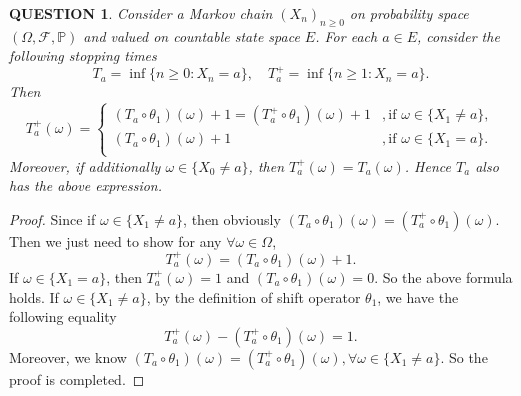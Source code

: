 \documentclass[12pt]{article}
\renewcommand{\(}{\left(}%
\renewcommand{\)}{\right)}%
\renewcommand{\[}{\left[}%
\renewcommand{\]}{\right]}%
\newcommand{\p}{\mathbb{P}}
\newcommand{\f}{\mathscr{F}}
\newtheorem{question}{QUESTION}[section]}
\newtheorem{proof}{Proof.}}
\begin{document}
  \begin{question}
  	Consider a Markov chain $(X_n)_{n\geq 0}$ on probability space $(\Omega,\f,\p)$ and valued on countable state space $E$. For each $a\in E$, consider the following stopping times
  	\begin{equation*}
  		T_a=\inf\{n\geq 0:X_n=a\},\quad T_a^+=\inf\{n\geq 1:X_n=a\}.
  	\end{equation*}
  	Then 
  	\begin{equation*}
  		T^+_a(\omega)=
  		\begin{cases}
  			(T_a\circ \theta_1)(\omega)+1=(T_a^+\circ\theta_1)(\omega)+1 &,\mbox{if }\omega\in \{X_1\neq a\},\\
  			(T_a\circ\theta_1)(\omega)+1&,\mbox{if }\omega\in \{X_1= a\}.\\
  		\end{cases}
  	\end{equation*}
  	Moreover, if additionally $\omega\in \{ X_0\neq a\}$, then $T_a^+(\omega)=T_a(\omega)$. Hence $T_a$ also has the above expression.
  \end{question}
  \begin{proof}
  	Since if $\omega\in \{X_1\neq a\}$, then obviously $(T_a\circ \theta_1)(\omega)=(T_a^+\circ\theta_1)(\omega)$. Then we just need to show for any $\forall\omega\in\Omega$,
  	\begin{equation*}
  		T^+_a(\omega)=(T_a\circ \theta_1)(\omega)+1.
  	\end{equation*}
  	If $\omega\in \{X_1= a\}$, then $T^+_a(\omega)=1$ and $(T_a\circ \theta_1)(\omega)=0$. So the above formula holds. If $\omega\in \{X_1\neq a\}$, by the definition of shift operator $\theta_1$, we have the following equality
  	\begin{equation*}
  		T^+_a(\omega)-(T_a^+\circ \theta_1)(\omega)=1.
  	\end{equation*}
  	Moreover, we know $(T_a\circ \theta_1)(\omega)=(T_a^+\circ\theta_1)(\omega),\forall \omega\in \{X_1\neq a\}$. So the proof is completed.
  \end{proof}
  
\end{document}
